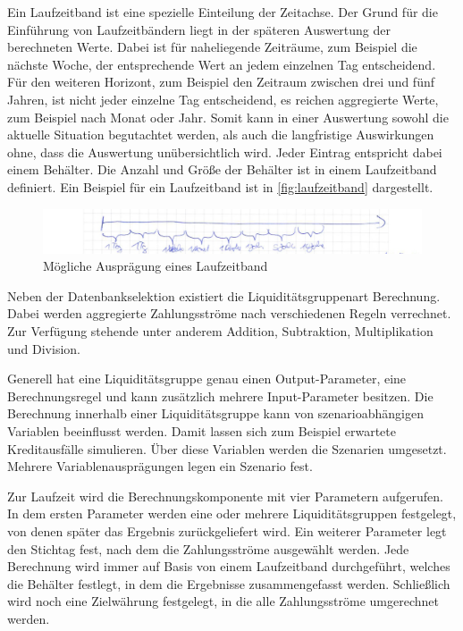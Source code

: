 \begin{onehalfspacing}
Ein Laufzeitband ist eine spezielle Einteilung der Zeitachse. Der Grund für die Einführung von Laufzeitbändern liegt in der späteren Auswertung der berechneten Werte. Dabei ist für naheliegende Zeiträume, zum Beispiel die nächste Woche, der entsprechende Wert an jedem einzelnen Tag entscheidend. Für den weiteren Horizont, zum Beispiel den Zeitraum zwischen drei und fünf Jahren, ist nicht jeder einzelne Tag  entscheidend, es reichen aggregierte Werte, zum Beispiel nach Monat oder Jahr. Somit kann in einer Auswertung sowohl die aktuelle Situation begutachtet werden, als auch die langfristige Auswirkungen ohne, dass die Auswertung unübersichtlich wird. Jeder Eintrag entspricht dabei einem Behälter. Die Anzahl und Größe der Behälter ist in einem Laufzeitband definiert. Ein Beispiel für ein Laufzeitband ist in \vref{fig:laufzeitband} dargestellt.

\begin{figure}[h]
\centering
\setlength{\unitlength}{1mm}
\includegraphics[width=15cm]{images/laufzeitband.jpg}
\caption{Mögliche Ausprägung eines Laufzeitband\label{fig:laufzeitband}}
\end{figure} 

Neben der Datenbankselektion existiert die Liquiditätsgruppenart Berechnung. Dabei werden aggregierte Zahlungsströme nach verschiedenen Regeln verrechnet. Zur Verfügung stehende unter anderem Addition, Subtraktion, Multiplikation und Division. 

Generell hat eine Liquiditätsgruppe genau einen Output-Parameter, eine Berechnungsregel und kann zusätzlich mehrere Input-Parameter besitzen. Die Berechnung innerhalb einer Liquiditätsgruppe kann von szenarioabhängigen Variablen beeinflusst werden. Damit lassen sich zum Beispiel erwartete Kreditausfälle simulieren. Über diese Variablen werden die Szenarien umgesetzt. Mehrere Variablenausprägungen legen ein Szenario fest.

\label{sec:berechnungskomponente:parameter}
Zur Laufzeit wird die Berechnungskomponente mit vier Parametern aufgerufen. In dem ersten Parameter werden eine oder mehrere Liquiditätsgruppen festgelegt, von denen später das Ergebnis zurückgeliefert wird. Ein weiterer Parameter legt den Stichtag fest, nach dem die Zahlungsströme ausgewählt werden. Jede Berechnung wird immer auf Basis von einem Laufzeitband durchgeführt, welches die Behälter festlegt, in dem die Ergebnisse zusammengefasst werden. Schließlich wird noch eine Zielwährung festgelegt, in die alle Zahlungsströme umgerechnet werden.


\end{onehalfspacing}
